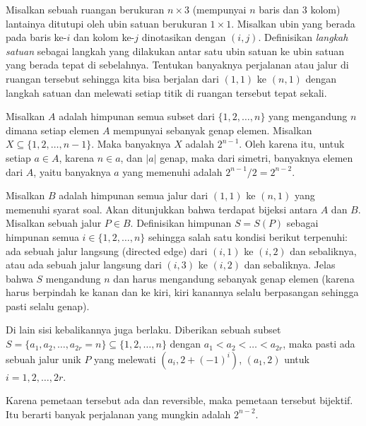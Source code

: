 \documentclass[12pt]{scrartcl}
\begin{document}
\begin{soaljawab}
    Misalkan sebuah ruangan berukuran $n \times 3$ (mempunyai $n$ baris dan $3$ kolom) lantainya ditutupi oleh ubin satuan berukuran $1 \times 1$. Misalkan ubin yang berada pada baris ke-$i$ dan kolom ke-$j$ dinotasikan dengan $(i,j)$. Definisikan \textit{langkah satuan} sebagai langkah yang dilakukan antar satu ubin satuan ke ubin satuan yang berada tepat di sebelahnya. Tentukan banyaknya perjalanan atau jalur di ruangan tersebut sehingga kita bisa berjalan dari $(1,1)$ ke $(n,1)$ dengan langkah satuan dan melewati setiap titik di ruangan tersebut tepat sekali.
    \begin{solusi}
        Misalkan $A$ adalah himpunan semua subset dari $\{1,2,\dots,n\}$ yang mengandung $n$ dimana setiap elemen $A$ mempunyai sebanyak genap elemen. Misalkan $X \subseteq \{1,2,\dots,n-1\}$.  Maka banyaknya $X$ adalah $2^{n-1}$. Oleh karena itu, untuk setiap $a \in A$, karena $n \in a$, dan $|a|$ genap, maka dari simetri, banyaknya elemen dari  $A$, yaitu banyaknya $a$ yang memenuhi adalah $2^{n-1}/2=2^{n-2}$.

        Misalkan $B$ adalah himpunan semua jalur dari $(1,1)$ ke $(n,1)$ yang memenuhi syarat soal. Akan ditunjukkan bahwa terdapat bijeksi antara $A$ dan $B$. Misalkan sebuah jalur $P \in B$. Definisikan himpunan $S=S(P)$ sebagai himpunan semua $i \in \{1,2,\dots,n\}$ sehingga salah satu kondisi berikut terpenuhi: ada sebuah jalur langsung (directed  edge) dari  $(i,1)$ ke $(i,2)$ dan sebaliknya, atau ada sebuah jalur langsung dari $(i,3)$ ke $(i,2)$ dan sebaliknya. Jelas bahwa $S$ mengandung $n$ dan harus mengandung sebanyak genap elemen (karena harus berpindah ke kanan dan ke kiri, kiri kanannya selalu berpasangan sehingga pasti selalu genap).

        Di lain sisi kebalikannya juga berlaku. Diberikan sebuah subset $S=\{a_1,a_2,\dots,a_{2r}=n\} \subseteq \{1,2,\dots,n\}$ dengan $a_1<a_2<\dots<a_{2r}$, maka pasti ada sebuah jalur unik $P$ yang melewati $(a_i, 2+(-1)^i)$, $(a_1,2)$ untuk $i=1,2,\dots,2r$.

        Karena pemetaan tersebut ada dan reversible, maka pemetaan tersebut bijektif. Itu berarti banyak perjalanan yang mungkin adalah $2^{n-2}$.
    \end{solusi}
\end{soaljawab}
\end{document}
